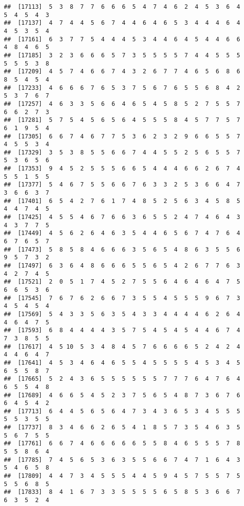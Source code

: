 \documentclass[
]{book}
\begin{document}
\begin{verbatim}
##  [17113]  5  3  8  7  7  6  6  6  5  4  7  4  6  2  4  5  3  6  4  5  4  5  4  3
##  [17137]  4  7  4  4  5  6  7  4  4  6  4  6  5  3  4  4  4  6  4  4  5  3  5  4
##  [17161]  6  3  7  7  5  4  4  4  5  3  4  4  6  4  5  4  4  6  6  4  8  4  6  5
##  [17185]  3  2  3  6  6  6  5  7  3  5  5  5  5  7  4  4  5  5  5  5  5  5  3  8
##  [17209]  4  5  7  4  6  6  7  4  3  2  6  7  7  4  6  5  6  8  6  8  5  4  5  4
##  [17233]  4  6  6  6  7  6  5  3  7  5  6  7  6  5  5  6  8  4  2  5  3  7  6  7
##  [17257]  4  6  3  3  5  6  6  4  6  5  4  5  8  5  2  7  5  5  7  6  6  2  7  3
##  [17281]  5  7  5  4  5  6  5  6  4  5  5  5  8  4  5  7  7  5  7  6  1  9  5  4
##  [17305]  6  6  7  4  6  7  7  5  3  6  2  3  2  9  6  6  5  5  7  4  5  5  3  4
##  [17329]  3  5  3  8  5  5  6  6  7  4  4  5  5  2  5  6  5  5  7  5  3  6  5  6
##  [17353]  9  4  5  2  5  5  5  6  6  5  4  4  4  6  6  2  6  7  4  5  5  1  5  5
##  [17377]  5  4  6  7  5  5  6  6  7  6  3  3  2  5  3  6  6  4  7  3  6  6  3  7
##  [17401]  6  5  4  2  7  6  1  7  4  8  5  2  5  6  3  4  5  8  5  4  4  7  4  5
##  [17425]  4  5  5  4  6  7  6  6  3  6  5  5  2  4  7  4  6  4  3  4  3  7  7  5
##  [17449]  4  5  6  2  6  4  6  3  5  4  4  6  5  6  7  4  7  6  4  6  7  6  5  7
##  [17473]  5  8  5  8  4  6  6  6  3  5  6  5  4  8  6  3  5  5  6  9  5  7  3  2
##  [17497]  6  3  6  4  8  6  6  6  5  5  6  5  4  2  6  7  7  6  3  4  2  7  4  5
##  [17521]  2  0  5  1  7  4  5  2  7  5  5  6  4  6  4  6  4  7  5  6  6  5  3  6
##  [17545]  7  6  7  6  2  6  6  7  3  5  5  4  5  5  5  9  6  7  3  4  5  4  5  4
##  [17569]  5  4  3  3  5  6  3  5  4  3  3  4  4  4  4  6  2  6  4  4  6  4  7  5
##  [17593]  6  8  4  4  4  4  3  5  7  5  4  5  4  5  4  4  6  7  4  7  3  8  5  5
##  [17617]  4  5 10  5  3  4  8  4  5  7  6  6  6  6  5  2  4  2  4  4  4  6  4  7
##  [17641]  4  5  3  4  6  4  6  5  5  4  5  5  5  5  4  5  3  4  5  6  5  5  8  7
##  [17665]  5  2  4  3  6  5  5  5  5  5  5  7  7  7  6  4  7  6  4  6  5  5  4  8
##  [17689]  4  6  6  5  4  5  2  3  7  5  6  5  4  8  7  3  6  7  6  6  4  5  4  2
##  [17713]  6  4  4  5  6  5  6  4  7  3  4  3  6  5  3  4  5  5  5  5  5  3  5  5
##  [17737]  8  3  4  6  6  2  6  5  4  1  8  5  7  3  5  4  6  3  5  5  6  7  5  5
##  [17761]  6  6  7  4  6  6  6  6  6  5  5  8  4  6  5  5  5  7  8  5  5  8  6  4
##  [17785]  7  4  5  6  5  3  6  3  5  5  6  6  7  4  7  1  6  4  3  5  4  6  5  8
##  [17809]  4  4  7  3  4  5  5  5  4  4  5  9  4  5  7  5  5  7  5  5  5  6  8  5
##  [17833]  8  4  1  6  7  3  3  5  5  5  5  6  5  8  5  3  6  6  7  6  3  5  2  4

\end{verbatim}
\end{document}
